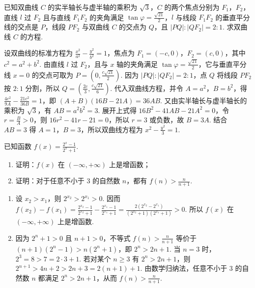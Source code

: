 \begin{problem}
已知双曲线 \(C\) 的实半轴长与虚半轴的乘积为 \(\sqrt{3}\)，\(C\) 的两个焦点分别为 \(F_1\)，\(F_2\)，直线 \(l\) 过 \(F_2\) 且与直线 \(F_1F_2\) 的夹角满足 \(\tan \varphi=\frac{\sqrt{21}}{2}\)，\(l\) 与线段 \(F_1F_2\) 的垂直平分线的交点是 \(P\)，线段 \(PF_2\) 与双曲线 \(C\) 的交点为 \(Q\)，且 \(|PQ|:|QF_2|=2:1\). 求双曲线 \(C\) 的方程.
\end{problem}

\begin{solution}
设双曲线的标准方程为 \(\frac{x^2}{a^2}-\frac{y^2}{b^2}=1\)，焦点为 \(F_1=(-c,0)\)，\(F_2=(c,0)\)，其中 \(c^2=a^2+b^2\). 由直线 \(l\) 过 \(F_2\)，且与 \(x\) 轴的夹角满足 \(\tan\varphi=\frac{\sqrt{21}}{2}\)，它与垂直平分线 \(x=0\) 的交点可取为 \(P=\left(0,\frac{c\sqrt{21}}{2}\right)\). 因为 \(|PQ|:|QF_2|=2:1\)，点 \(Q\) 将线段 \(PF_2\) 按 \(2:1\) 分割，所以 \(Q=\left(\frac{2c}{3},\frac{c\sqrt{21}}{6}\right)\). 代入双曲线方程，并令 \(A=a^2\)，\(B=b^2\)，得
\(\frac{4c^2}{9A}-\frac{21c^2}{36B}=1\)，即 \((A+B)(16B-21A)=36AB\). 又由实半轴长与虚半轴长的乘积为 \(\sqrt{3}\)，有 \(AB=a^2b^2=3\). 展开上式得 \(16B^2-41AB-21A^2=0\)，令 \(r=\frac{B}{A}>0\)，则 \(16r^2-41r-21=0\)，所以 \(r=3\) 或负数，故 \(B=3A\). 结合 \(AB=3\) 得 \(A=1\)，\(B=3\)，所以双曲线方程为 \(x^2-\frac{y^2}{3}=1\).
\end{solution}

\begin{problem}
已知函数 \(f(x)=\frac{2^x-1}{2^x+1}\).
\begin{enumerate}
\item 证明：\(f(x)\) 在 \((-\infty,+\infty)\) 上是增函数；
\item 证明：对于任意不小于 \(3\) 的自然数 \(n\)，都有 \(f(n)>\frac{n}{n+1}\).
\end{enumerate}

\begin{solution}
\begin{enumerate}
\item 设 \(x_2>x_1\)，则 \(2^{x_2}>2^{x_1}>0\). 因而
\(f(x_2)-f(x_1)=\frac{2^{x_2}-1}{2^{x_2}+1}-\frac{2^{x_1}-1}{2^{x_1}+1}=\frac{2\left(2^{x_2}-2^{x_1}\right)}{\left(2^{x_2}+1\right)\left(2^{x_1}+1\right)}>0\). 所以 \(f(x)\) 在 \((-\infty,+\infty)\) 上是增函数.
\item 因为 \(2^n+1>0\) 且 \(n+1>0\)，不等式 \(f(n)>\frac{n}{n+1}\) 等价于 \((n+1)(2^n-1)>n(2^n+1)\)，即 \(2^n>2n+1\). 当 \(n=3\) 时，\(2^3=8>7=2\cdot3+1\). 若对某个 \(n\geqslant3\) 有 \(2^n>2n+1\)，则 \(2^{n+1}>4n+2>2n+3=2(n+1)+1\). 由数学归纳法，任意不小于 \(3\) 的自然数 \(n\) 都满足 \(2^n>2n+1\)，从而 \(f(n)>\frac{n}{n+1}\).
\end{enumerate}
\end{solution}
\end{problem}
